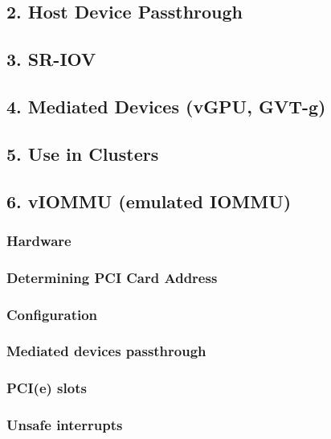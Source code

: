 \subsection{2. Host Device Passthrough}

\subsection{3. SR-IOV}

\subsection{4. Mediated Devices (vGPU, GVT-g)}

\subsection{5. Use in Clusters}

\subsection{6. vIOMMU (emulated IOMMU)}

\subsubsection{Hardware}

\subsubsection{Determining PCI Card Address}

\subsubsection{Configuration}

\subsubsection{Mediated devices passthrough}

\subsubsection{PCI(e) slots}

\subsubsection{Unsafe interrupts}

